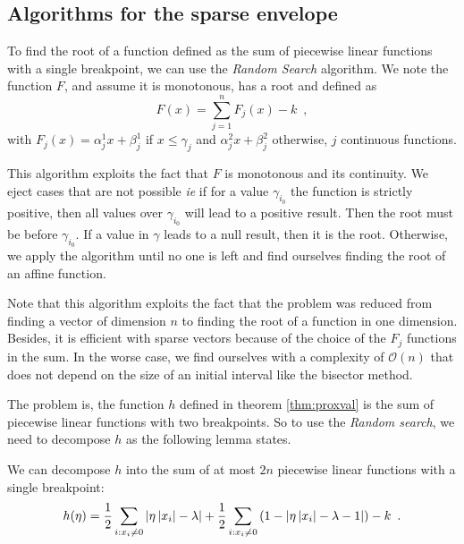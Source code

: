 
\subsection[Algorithm]{Algorithms for the sparse envelope}
To find the root of a function defined as the sum of piecewise linear functions with a single breakpoint, we can use the \textit{Random Search} algorithm. We note the function $F$, and assume it is monotonous, has a root and defined as \[F(x)=\sum_{j=1}^n F_j(x) - k\enspace,\] with $F_j(x)=\alpha^1_jx + \beta^1_j$ if $x\leq \gamma_j$ and $\alpha_j^2x+\beta_j^2$ otherwise, $j$ continuous functions.



This algorithm exploits the fact that $F$ is monotonous and its continuity. We eject cases that are not possible \textit{ie} if for a value $\gamma_{i_0}$ the function is strictly positive, then all values over $\gamma_{i_0}$ will lead to a positive result. Then the root must be before $\gamma_{i_0}$. If a value in $\gamma$ leads to a null result, then it is the root. Otherwise, we apply the algorithm until no one is left and find ourselves finding the root of an affine function.

\begin{remark}
Note that this algorithm exploits the fact that the problem was reduced from finding a vector of dimension $n$ to finding the root of a function in one dimension. Besides, it is efficient with sparse vectors because of the choice of the $F_j$ functions in the sum. In the worse case, we find ourselves with a complexity of $\mathcal{O}(n)$ that does not depend on the size of an initial interval like the bisector method.
\end{remark}

The problem is, the function $h$ defined in theorem \ref{thm:proxval} is the sum of piecewise linear functions with two breakpoints. So to use the \textit{Random search}, we need to decompose $h$ as the following lemma states.

\begin{lemma}
We can decompose $h$ into the sum of at most $2n$ piecewise linear functions with a single breakpoint:
\[h(\eta)=\frac{1}{2}\sum_{i:x_i\neq 0}\left|\eta\left|x_i\right|-\lambda\right| +\frac{1}{2}\sum_{i:x_i\neq 0}\left(1-\left|\eta \left|x_i\right| - \lambda - 1\right|\right) - k\enspace.\]
\end{lemma}

